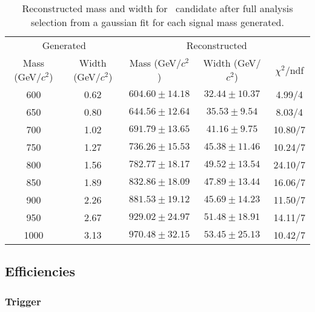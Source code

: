 \begin{table*}[htbH]
\begin{center}
\begin{tabular}{|c|c|c|c|c|}
\hline 
\multicolumn{2}{|c}{Generated} & \multicolumn{3}{|c|}{Reconstructed} \\
Mass (GeV/$c^{2}$) & Width (GeV/$c^{2}$) & Mass (GeV/$c^{2}$) & Width (GeV/$c^{2}$) & $\chi^{2} /$ndf\\
\hline
600 & 0.62 &$604.60\pm14.18$ & $32.44\pm10.37$ & 4.99/4\\
650 & 0.80 &$644.56\pm12.64$ & $35.53\pm9.54$ & 8.03/4\\
700 & 1.02 &$691.79\pm13.65$ & $41.16\pm9.75$ & 10.80/7\\
750 & 1.27 &$736.26\pm15.53$ & $45.38\pm11.46$ & 10.24/7\\
800 & 1.56 &$782.77\pm18.17$ & $49.52\pm13.54$ & 24.10/7\\
850 & 1.89 &$832.86\pm18.09$ & $47.89\pm13.44$ & 16.06/7\\
900 & 2.26 &$881.53\pm19.12$ & $45.69\pm14.23$ & 11.50/7\\
950 & 2.67 &$929.02\pm24.97$ & $51.48\pm18.91$ & 14.11/7\\
1000 & 3.13 &$970.48\pm32.15$ & $53.45\pm25.13$ & 10.42/7\\
\hline
\end{tabular}
\caption{Reconstructed mass and width for \Tp~candidate after full analysis selection from a gaussian fit for each signal mass generated. \label{tab:SignalWidths}}
\end{center}
\end{table*}

\subsection{Efficiencies}
\label{sec:eff}

\subsubsection{Trigger}
\label{sec:trigger_ana}

